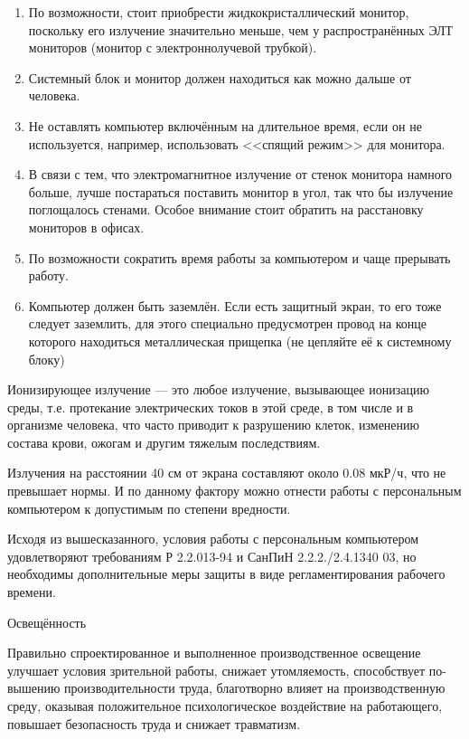 \begin{enumerate}[1.]
	\item По возможности, стоит приобрести жидкокристаллический монитор, поскольку его излучение значительно меньше, чем у распространённых ЭЛТ мониторов (монитор с электроннолучевой трубкой). 
	\item Системный блок и монитор должен находиться как можно дальше от человека.
	\item Не оставлять компьютер включённым на длительное время, если он не используется, например, использовать <<спящий режим>> для монитора.
	\item В связи с тем, что электромагнитное излучение от стенок монитора намного больше, лучше постараться поставить монитор в угол, так что бы излучение поглощалось стенами. Особое внимание стоит обратить на расстановку мониторов в офисах.
	\item По возможности сократить время работы за компьютером и чаще прерывать работу.
	\item Компьютер должен быть заземлён. Если есть защитный экран, то его тоже следует заземлить, для этого специально предусмотрен провод на конце которого находиться металлическая прищепка (не цепляйте её к системному блоку)
\end{enumerate}

Ионизирующее излучение --- это любое излучение, вызывающее ионизацию среды, т.е. протекание электрических токов в этой среде, в том числе и в организме человека, что часто приводит к разрушению клеток, изменению состава крови, ожогам и другим тяжелым последствиям.

Излучения на расстоянии 40 см от экрана составляют около 0.08 мкР/ч, что не превышает нормы.
И по данному фактору можно отнести работы с персональным компьютером к допустимым по степени вредности. 

Исходя из вышесказанного, условия работы с персональным компьютером удовлетворяют требованиям Р 2.2.013-94 и СанПиН 2.2.2./2.4.1340 03, но необходимы дополнительные меры защиты в виде регламентирования рабочего времени.

\point Освещённость

Правильно спроектированное и выполненное производственное освещение улучшает условия зрительной работы, снижает утомляемость, способствует по-вышению производительности труда, благотворно влияет на производственную среду, оказывая положительное психологическое воздействие на работающего, повышает безопасность труда и  снижает травматизм.

